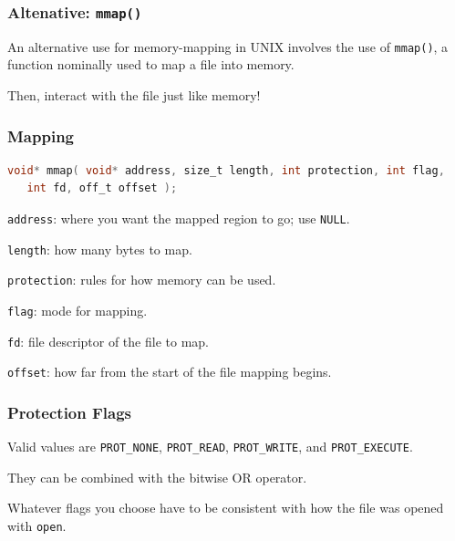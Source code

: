 \begin{frame}
	\frametitle{Altenative: \texttt{mmap()}}

	An alternative use for memory-mapping in UNIX involves the use of \texttt{mmap()}, a function nominally used to map a file into memory.

	Then, interact with the file just like memory!

\end{frame}


\begin{frame}[fragile]
	\frametitle{Mapping}
	\begin{lstlisting}[language=C]
void* mmap( void* address, size_t length, int protection, int flag,
   int fd, off_t offset );
\end{lstlisting}

	\texttt{address}: where you want the mapped region to go; use \texttt{NULL}.

	\texttt{length}: how many bytes to map.

	\texttt{protection}: rules for how memory can be used.

	\texttt{flag}: mode for mapping.

	\texttt{fd}: file descriptor of the file to map.

	\texttt{offset}: how far from the start of the file mapping begins.

\end{frame}


\begin{frame}
	\frametitle{Protection Flags}

	Valid values are \texttt{PROT\_NONE}, \texttt{PROT\_READ}, \texttt{PROT\_WRITE}, and \texttt{PROT\_EXECUTE}.

	They can be combined with the bitwise OR operator.

	Whatever flags you choose have to be consistent with how the file was opened with \texttt{open}.

\end{frame}


